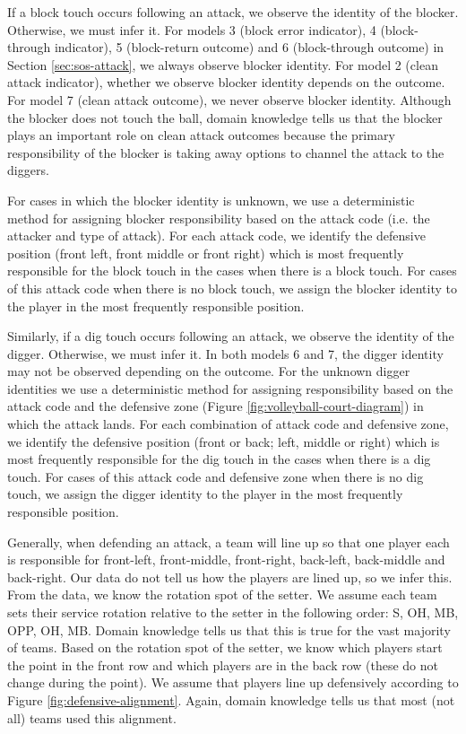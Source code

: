 \documentclass[USenglish]{article}
\theoremstyle{dgthm}
\theoremstyle{dgdef}
\begin{document}
If a block touch occurs following an attack, we observe the identity of the blocker. Otherwise, we must infer it. For models 3 (block error indicator), 4 (block-through indicator), 5 (block-return outcome) and 6 (block-through outcome) in Section \ref{sec:sos-attack}, we always observe blocker identity. For model 2 (clean attack indicator), whether we observe blocker identity depends on the outcome. For model 7 (clean attack outcome), we never observe blocker identity. Although the blocker does not touch the ball, domain knowledge tells us that the blocker plays an important role on clean attack outcomes because the primary responsibility of the blocker is taking away options to channel the attack to the diggers.

For cases in which the blocker identity is unknown, we use a deterministic method for assigning blocker responsibility based on the attack code (i.e. the attacker and type of attack). For each attack code, we identify the defensive position (front left, front middle or front right) which is most frequently responsible for the block touch in the cases when there is a block touch. For cases of this attack code when there is no block touch, we assign the blocker identity to the player in the most frequently responsible position.

Similarly, if a dig touch occurs following an attack, we observe the identity of the digger. Otherwise, we must infer it. In both models 6 and 7, the digger identity may not be observed depending on the outcome. For the unknown digger identities we use a deterministic method for assigning responsibility based on the attack code and the defensive zone (Figure \ref{fig:volleyball-court-diagram}) in which the attack lands. For each combination of attack code and defensive zone, we identify the defensive position (front or back; left, middle or right) which is most frequently responsible for the dig touch in the cases when there is a dig touch. For cases of this attack code and defensive zone when there is no dig touch, we assign the digger identity to the player in the most frequently responsible position.

Generally, when defending an attack, a team will line up so that one player each is responsible for front-left, front-middle, front-right, back-left, back-middle and back-right. Our data do not tell us how the players are lined up, so we infer this. From the data, we know the rotation spot of the setter. We assume each team sets their service rotation relative to the setter in the following order: S, OH, MB, OPP, OH, MB. Domain knowledge tells us that this is true for the vast majority of teams. Based on the rotation spot of the setter, we know which players start the point in the front row and which players are in the back row (these do not change during the point). We assume that players line up defensively according to Figure \ref{fig:defensive-alignment}. Again, domain knowledge tells us that most (not all) teams used this alignment.
\end{document}

